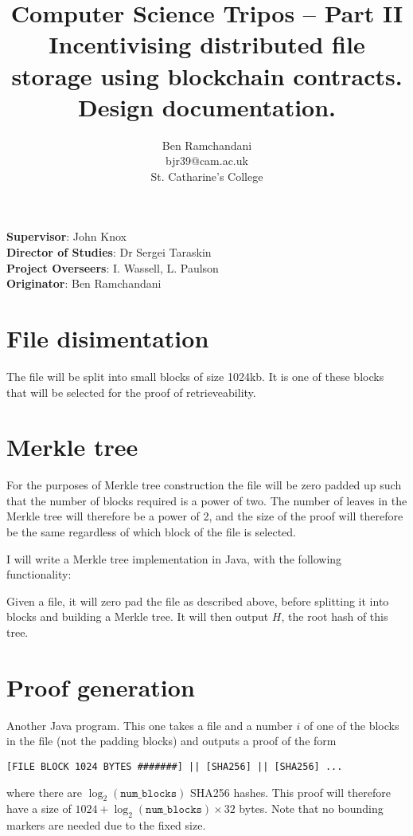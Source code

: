\documentclass[oneside]{article}
\title{
{\Large Computer Science Tripos -- Part II}\\
\vspace{1em}
Incentivising distributed file storage using blockchain contracts.\\
Design documentation.}
\author{Ben Ramchandani \\ bjr39@cam.ac.uk \\ St. Catharine's College}
\begin{document}
\maketitle

\textbf{Supervisor}: John Knox\\
\textbf{Director of Studies}: Dr Sergei Taraskin\\
\textbf{Project Overseers}: I. Wassell, L. Paulson\\
\textbf{Originator}: Ben Ramchandani

\section{File disimentation}

The file will be split into small blocks of size 1024kb.
It is one of these blocks that will be selected for the proof of retrieveability.

\section{Merkle tree}

For the purposes of Merkle tree construction the file will be zero padded up such that the number of blocks required is a power of two.
The number of leaves in the Merkle tree will therefore be a power of 2, and the size of the proof will therefore be the same regardless of which block of the file is selected.

I will write a Merkle tree implementation in Java, with the following functionality:

Given a file, it will zero pad the file as described above, before splitting it into blocks and building a Merkle tree.
It will then output $H$, the root hash of this tree.

\section{Proof generation}

Another Java program.
This one takes a file and a number $i$ of one of the blocks in the file (not the padding blocks) and outputs a proof of the form
\begin{verbatim}[FILE BLOCK 1024 BYTES #######] || [SHA256] || [SHA256] ...\end{verbatim}
where there are $\log_2(\texttt{num\_blocks})$ SHA256 hashes.
This proof will therefore have a size of $1024 + \log_2(\texttt{num\_blocks}) \times 32$ bytes.
Note that no bounding markers are needed due to the fixed size.
\end{document}
